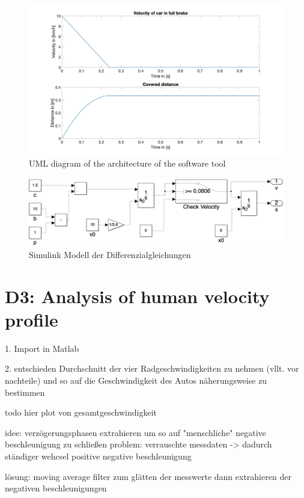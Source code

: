 \begin{figure}[H]
\centering
\includegraphics[width=1\textwidth]{images/D2_plot.jpg}
\caption{UML diagram of the architecture of the software tool}
\label{fig:ConceptArchitectureOverview}
\end{figure}

\begin{figure}[H]
\centering
\includegraphics[width=1\textwidth]{images/D2_sim.png}
\caption{Simulink Modell der Differenzialgleichungen}
\label{fig:ConceptArchitectureOverview}
\end{figure}

\chapter{D3: Analysis of human velocity profile}\label{cha:D3}
1. Import in Matlab

2. entschieden Durchschnitt der vier Radgeschwindigkeiten zu nehmen (vllt. vor nachteile)
und so auf die Geschwindigkeit des Autos näherungsweise zu bestimmen

todo hier plot von gesamtgeschwindigkeit

idee: verzögerungsphasen extrahieren um so auf "menschliche" negative beschleunigung zu schließen
problem: verrauschte messdaten -> dadurch ständiger wehcsel positive negative beschleunigung

lösung: moving average filter zum glätten der messwerte
dann extrahieren der negativen beschleunigungen

